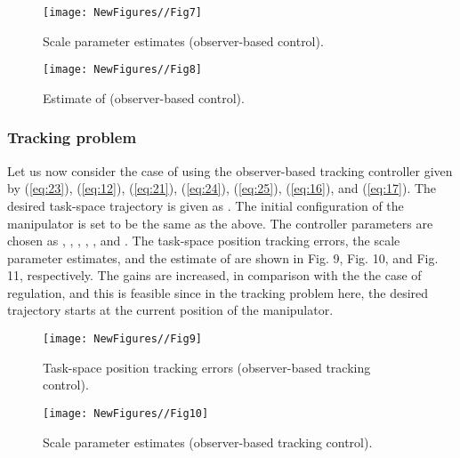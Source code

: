 \documentclass[9pt,technote]{IEEEtran}
\begin{document}
{\begin{figure}
\centering
\begin{minipage}[t]{1.0\linewidth}
\centering
\texttt{[image: NewFigures//Fig7]}
\caption{Scale parameter estimates (observer-based control).}\label{fig:side:a}
\end{minipage}\end{figure}

\begin{figure}
\centering
\begin{minipage}[t]{1.0\linewidth}
\centering
\texttt{[image: NewFigures//Fig8]}
\caption{Estimate of  (observer-based control).}\label{fig:side:a}
\end{minipage}\end{figure}

\subsubsection{Tracking problem}

Let us now consider the case of using the observer-based tracking controller given by (\ref{eq:23}), (\ref{eq:12}), (\ref{eq:21}), (\ref{eq:24}), (\ref{eq:25}), (\ref{eq:16}), and (\ref{eq:17}). The desired task-space trajectory is given as . The initial configuration of the manipulator is set to be the same as the above. The controller parameters are chosen as , , , , , and . The task-space position tracking errors, the scale parameter estimates, and the estimate of  are shown in Fig. 9, Fig. 10, and Fig. 11, respectively. The gains are increased, in comparison with the the case of regulation, and this is feasible since in the tracking problem here, the desired trajectory starts at the current position of the manipulator.

\begin{figure}
\centering
\begin{minipage}[t]{1.0\linewidth}
\centering
\texttt{[image: NewFigures//Fig9]}
\caption{Task-space position tracking errors (observer-based tracking control).}\label{fig:side:a}
\end{minipage}\end{figure}

\begin{figure}
\centering
\begin{minipage}[t]{1.0\linewidth}
\centering
\texttt{[image: NewFigures//Fig10]}
\caption{Scale parameter estimates (observer-based tracking control).}\label{fig:side:a}
\end{minipage}\end{figure}

}
\end{document}
